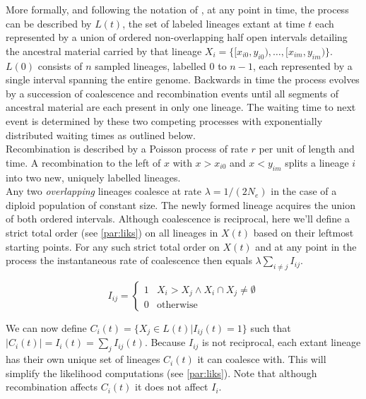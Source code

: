 \documentclass{article}
\begin{document}
More formally, and following the notation of \citet{mcvean_approximating_2005}, at any 
point in time, the process can be described by $L(t)$, the set of labeled lineages 
extant at time $t$ each represented by a union of ordered non-overlapping half open 
intervals detailing the ancestral material 
carried by that lineage $X_i = \{[x_{i0}, y_{i0}), \dotsc, [x_{im}, y_{im})\}$.
$L(0)$ consists of $n$ sampled lineages, labelled $0$ to $n-1$, each represented by a 
single interval spanning the entire genome.
Backwards in time the process evolves by a succession of coalescence and recombination 
events until all segments of ancestral material are each present in only one lineage. 
The waiting time to next event is determined by these two competing processes with exponentially 
distributed waiting times as outlined below.\\

Recombination is described by a Poisson process of rate $r$ per unit of length and time. 
A recombination to the 
left of $x$ with $x>x_{i0}$ and $x<y_{im}$ splits a lineage $i$ into two new, uniquely 
labelled lineages.\\

Any two \emph{overlapping} lineages coalesce at rate $\lambda = 1/(2N_e)$ in the case
of a diploid population of constant size. The newly formed lineage acquires the 
union of both ordered intervals.
Although coalescence is reciprocal, here we'll define a strict total order 
(see \ref{par:liks}) on 
all lineages in $X(t)$ based on their leftmost starting points. 
For any such strict total order on $X(t)$ and at any point in the process 
the instantaneous rate of coalescence then equals $\lambda \sum_{i \neq j} I_{ij}$.

\begin{equation} \label{def:coal}
I_{ij} = \begin{cases}
1 & X_i > X_j \wedge X_i \cap X_j \neq \emptyset \\
0 & \text{otherwise}
\end{cases}
\end{equation}

We can now define $C_i(t) = \{X_j \in L(t) | I_{ij}(t) = 1\}$ such that $|C_i(t)| = 
I_{i}(t) = \sum_{j} I_{ij}(t)$.
Because $I_{ij}$ is not reciprocal, each extant lineage has their own unique set of 
lineages $C_i(t)$ it can coalesce with. This will simplify the likelihood computations 
(see \ref{par:liks}). Note that although recombination affects $C_i(t)$ it does not 
affect $I_{i}$.\\ 
\end{document}
